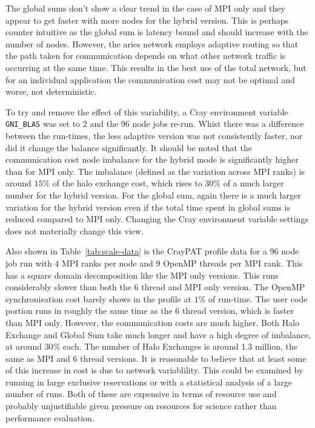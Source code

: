The global sums don't show a clear trend in the case of MPI only and
they appear to get faster with more nodes for the hybrid version. This
is perhaps counter intuitive as the global sum is latency bound and
should increase with the number of nodes. However, the aries network
employs adaptive routing so that the path taken for communication
depends on what other network traffic is occurring at the same
time. This results in the best use of the total network, but for an
individual application the communication cost may not be optimal and
worse, not deterministic.

To try and remove the effect of this variability, a Cray environment
variable \verb+GNI_BLAS+ was set to $2$ and the $96$ node jobs re-run.
Whist there was a difference between the run-times, the less adaptive
version was not consistently faster, nor did it change the balance
significantly. It should be noted that the communication cost
node imbalance for the hybrid mode is significantly higher than for MPI
only. The imbalance (defined as the variation across MPI ranks) is
around $15\%$ of the halo exchange cost, which rises to $30\%$ of a
much larger number for the hybrid version. For the global sum, again
there is a much larger variation for the hybrid version even if the total time spent in
global sums is reduced compared to MPI only. Changing the Cray
environment variable settings does not materially change this view. 

Also shown in Table~\ref{tab:scale-data} is the CrayPAT profile data
for a $96$ node job run with $4$ MPI ranks per node and $9$ OpenMP
threads per MPI rank. This has a square domain decomposition like the
MPI only versions. This runs considerably slower than both the $6$
thread and MPI only version. The OpenMP synchronisation cost barely
shows in the profile at $1\%$ of run-time. The user code portion runs
in roughly the same time as the $6$ thread version, which is faster
than MPI only. However, the communication costs are much higher. Both
Halo Exchange and Global Sum take much longer and have a high degree
of imbalance, at around $30\%$ each. The number of Halo Exchanges is
around 1.3 million, the same as MPI and $6$ thread versions.  It is
reasonable to believe that at least some of this increase in cost is
due to network variablility. This could be examined by running in
large exclusive reservations or with a statistical analysis of a large
number of runs. Both of these are expensive in terms of resource use and
probably unjustifiable given pressure on resources for science rather
than performance evaluation.

